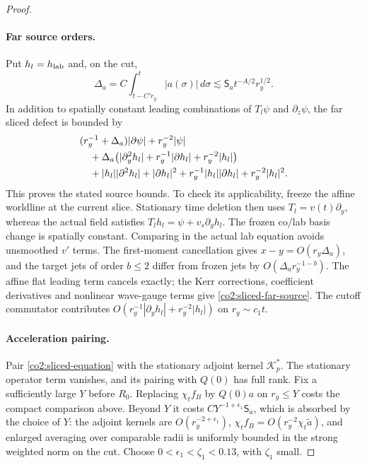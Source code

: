 \begin{proof}
\paragraph{Far source orders.}
Put $h_l=h_{\rm lab}$ and, on the cut,
\[
 \Delta_a=C\int_{t-C'r_y}^t|a(\sigma)|\,d\sigma
       \lesssim\mathsf S_a t^{-A/2}r_y^{1/2}.
\]
In addition to spatially constant leading combinations of
$T_l\psi$ and $\partial_z\psi$, the far sliced defect is bounded by
\begin{align}\label{co2:sliced-far-source}
 &(r_y^{-1}+\Delta_a)|\partial\psi|+r_y^{-2}|\psi|\notag\\
 &\quad+\Delta_a\bigl(|\partial_y^2h_l|
              +r_y^{-1}|\partial h_l|+r_y^{-2}|h_l|\bigr)\notag\\
 &\quad+|h_l||\partial^2h_l|+|\partial h_l|^2
              +r_y^{-1}|h_l||\partial h_l|+r_y^{-2}|h_l|^2.
\end{align}
This proves the stated source bounds.  To check its applicability,
freeze the affine worldline at the current slice.  Stationary time deletion
then uses $T_l=v(t)\partial_y$, whereas the actual field satisfies
$T_lh_l=\psi+v_s\partial_yh_l$.  The frozen co/lab basis change is spatially
constant.  Comparing in the actual lab equation avoids unsmoothed $v'$ terms.
The first-moment cancellation gives $x-y=O(r_y\Delta_a)$, and the target
jets of order $b\le2$ differ from frozen jets by
$O(\Delta_a r_y^{-1-b})$.  The affine flat leading term cancels exactly;
the Kerr corrections, coefficient derivatives and nonlinear wave-gauge terms
give \eqref{co2:sliced-far-source}.  The cutoff commutator contributes
$O(r_y^{-1}|\partial_yh_l|+r_y^{-2}|h_l|)$ on $r_y\sim c_1t$.

\paragraph{Acceleration pairing.}
Pair \eqref{co2:sliced-equation} with the stationary adjoint kernel
$\mathcal K_p^*$.  The stationary operator term vanishes, and its pairing
with $Q(0)$ has full rank.  Fix a sufficiently large $Y$ before $R_0$.
Replacing $\chi_t f_B$ by $Q(0)a$ on $r_y\le Y$ costs the compact
comparison above.  Beyond $Y$ it costs
$CY^{-1+\epsilon_1}\mathsf S_a$, which is absorbed by the choice of $Y$:
the adjoint kernels are $O(r_y^{-2+\epsilon_1})$,
$\chi_t f_B=O(r_y^{-2}\chi_t\widetilde a)$, and enlarged averaging over
comparable radii is uniformly bounded in the strong weighted norm on the cut.
Choose $0<\epsilon_1<\zeta_1<0.13$, with $\zeta_1$ small.


\end{proof}
